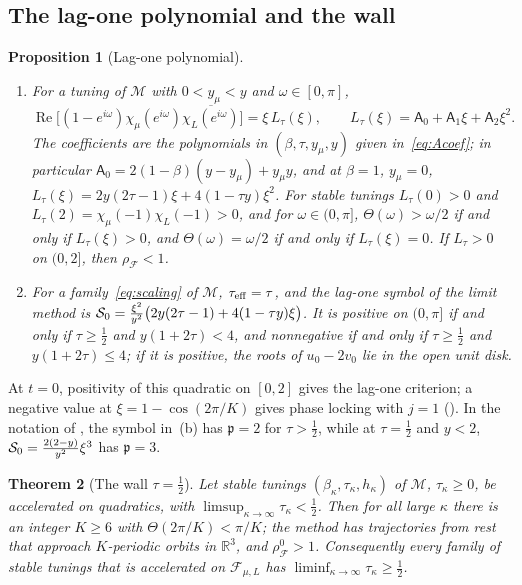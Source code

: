 \documentclass[11pt]{article}
\newtheorem{theorem}{Theorem}[section]
\newtheorem{proposition}[theorem]{Proposition}
\theoremstyle{definition}
\theoremstyle{remark}
\newcommand{\R}{\mathbb R}
\newcommand{\cF}{\mathcal F}
\newcommand{\cM}{\mathcal M}
\newcommand{\Rea}{\operatorname{Re}}
\newcommand{\rhoF}{\rho_{\cF}}
\newcommand{\rhoz}{\rho_{\cF}^{0}}
\newcommand{\teff}{\tau_{\rm eff}}
\begin{document}
\subsection{The lag-one polynomial and the wall}
\label{sec:Ltau}

\begin{proposition}[Lag-one polynomial]\label{prop:Ltau}
\leavevmode
\begin{enumerate}[label=\textup{(\alph*)}]
\item For a tuning of \(\cM\) with \(0<y_\mu<y\) and \(\omega\in[0,\pi]\),
\[
\Rea\bigl[(1-e^{i\omega})\chi_\mu(e^{i\omega})\overline{\chi_L(e^{i\omega})}\bigr]=\xi\,L_\tau(\xi),\qquad L_\tau(\xi)=\mathsf A_0+\mathsf A_1\xi+\mathsf A_2\xi^2.
\]
The coefficients are the polynomials in \((\beta,\tau,y_\mu,y)\) given in~\eqref{eq:Acoef}; in particular
\(\mathsf A_0=2(1-\beta)(y-y_\mu)+y_\mu y\), and at \(\beta=1\), \(y_\mu=0\), \(L_\tau(\xi)=2y(2\tau-1)\xi+4(1-\tau y)\xi^2\).
For stable tunings \(L_\tau(0)>0\) and \(L_\tau(2)=\chi_\mu(-1)\chi_L(-1)>0\),
and for \(\omega\in(0,\pi]\), \(\Theta(\omega)>\omega/2\) if and only if
\(L_\tau(\xi)>0\), and \(\Theta(\omega)=\omega/2\) if and only if
\(L_\tau(\xi)=0\).  If \(L_\tau>0\) on \((0,2]\), then \(\rhoF<1\).
\item For a family~\eqref{eq:scaling} of \(\cM\), \(\teff=\tau\), and the lag-one symbol of the limit method is
\(\mathcal S_0=\frac{\xi^2}{y^2}\bigl(2y(2\tau-1)+4(1-\tau y)\xi\bigr)\).  It is positive on \((0,\pi]\) if and only if
\(\tau\ge\frac12\) and \(y(1+2\tau)<4\), and nonnegative if and only if \(\tau\ge\frac12\) and \(y(1+2\tau)\le4\); if it is positive, the
roots of \(u_0-2v_0\) lie in the open unit disk.
\end{enumerate}
\end{proposition}

At \(t=0\), positivity of this quadratic on \([0,2]\) gives the lag-one criterion;
a negative value at \(\xi=1-\cos(2\pi/K)\) gives phase locking with \(j=1\)
().  In the notation of , the symbol in~(b) has \(\mathfrak p=2\) for
\(\tau>\frac12\), while at \(\tau=\frac12\) and \(y<2\), \(\mathcal S_0=\frac{2(2-y)}{y^2}\xi^3\) has \(\mathfrak p=3\).

\begin{theorem}[The wall \(\tau=\tfrac12\)]\label{thm:wall}
Let stable tunings \((\beta_\kappa,\tau_\kappa,h_\kappa)\) of \(\cM\), \(\tau_\kappa\ge0\), be
accelerated on quadratics, with \(\limsup_{\kappa\to\infty}\tau_\kappa<\frac12\).  Then for
all large \(\kappa\) there is an integer \(K\ge6\) with \(\Theta(2\pi/K)<\pi/K\); the
method has trajectories from rest that approach \(K\)-periodic orbits in
\(\R^3\), and \(\rhoz>1\).  Consequently every family of stable tunings that is
accelerated on \(\cF_{\mu,L}\) has \(\liminf_{\kappa\to\infty}\tau_\kappa\ge\frac12\).
\end{theorem}
\end{document}
